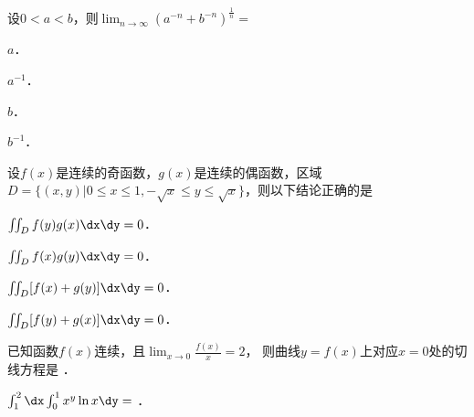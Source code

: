 \documentclass[plain,noanswer,medmath]{../../template/jnuexam}
\begin{document}






\begin{problem}
设$0 < a < b$，则$\lim_{n\to\infty}\left(a^{-n} + b^{-n}\right)^{\frac{1}{n}}=$\pickout{}
\begin{abcd}
\item $a$．
\item $a^{-1}$．
\item $b$．
\item $b^{-1}$．
\end{abcd}
\end{problem}




\begin{problem}
设$f(x)$是连续的奇函数，$g(x)$是连续的偶函数，区域\goodbreak
$D = \{(x,y)|0 \le x \le 1, - \sqrt{x} \le y \le \sqrt{x}\}$，则以下结论正确的是\pickout{}
\begin{abcd}
\item $\iint_D f(y)g(x)\dx\dy = 0$．
\item $\iint_D f(x)g(y)\dx\dy = 0$．
\item $\iint_D [f(x) + g(y)]\dx\dy = 0$．
\item $\iint_D [f(y) + g(x)]\dx\dy = 0$．
\end{abcd}
\end{problem}
















\begin{problem}
已知函数$f(x)$连续，且$\lim_{x \to 0} \frac{f(x)}{x} = 2$，
则曲线$y = f(x)$上对应$x = 0$处的切线方程是 \fillin{}．
\end{problem}


\begin{problem}
$\int_1^2 \dx \int_0^1 x^y\ln x\dy =$ \fillin{}．
\end{problem}
\end{document}
